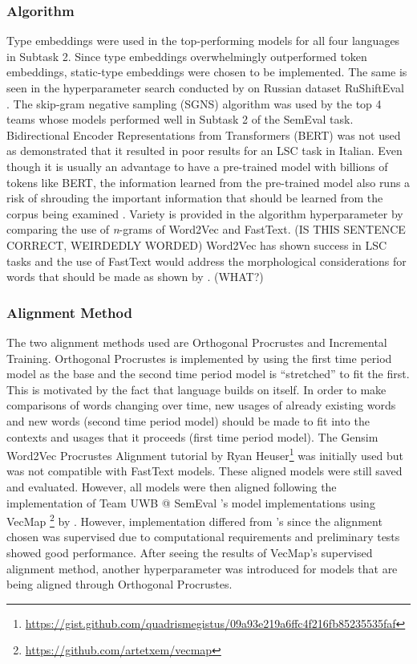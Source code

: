 \subsubsection{Algorithm}

Type embeddings were used in the top-performing models for all four languages in Subtask 2.  Since type embeddings overwhelmingly outperformed token embeddings, static-type embeddings were chosen to be implemented. The same is seen in the hyperparameter search conducted by \citet{hengchen2021SBXrushifteval} on Russian dataset RuShiftEval \citep{rushifteval2021}. The skip-gram negative sampling (SGNS) algorithm was used by the top 4 teams whose models performed well in Subtask 2 of the SemEval task. Bidirectional Encoder Representations from Transformers (BERT) was not used as \citet{laicher-2020} demonstrated that it resulted in poor results for an LSC task in Italian. Even though it is usually an advantage to have a pre-trained model with billions of tokens like BERT, the information learned from the pre-trained model also runs a risk of shrouding the important information that should be learned from the corpus being examined \citep{hengchen2021challenges}. Variety is provided in the algorithm hyperparameter by comparing the use of \emph{n}-grams of Word2Vec and FastText. (IS THIS SENTENCE CORRECT, WEIRDEDLY WORDED) Word2Vec has shown success in LSC tasks and the use of FastText would address the morphological considerations for words that should be made as shown by \citet{bojanowski2017enriching}. (WHAT?)


\subsubsection{Alignment Method}

The two alignment methods used are Orthogonal Procrustes and Incremental Training. Orthogonal Procrustes is implemented by using the first time period model as the base and the second time period model is “stretched” to fit the first. This is motivated by the fact that language builds on itself. In order to make comparisons of words changing over time, new usages of already existing words and new words (second time period model) should be made to fit into the contexts and usages that it proceeds (first time period model). The Gensim Word2Vec Procrustes Alignment tutorial by Ryan Heuser\footnote{\url{https://gist.github.com/quadrismegistus/09a93e219a6ffc4f216fb85235535faf}}  was initially used but was not compatible with FastText models. These aligned models were still saved and evaluated. However, all models were then aligned following the implementation of Team UWB @ SemEval \citet{prazak-etal-2020-uwb}’s model implementations using VecMap \footnote{\url{https://github.com/artetxem/vecmap}} by \citet{artetxe2018generalizing}. However, implementation differed from \citet{prazak-etal-2020-uwb}’s since the alignment chosen was supervised due to computational requirements and preliminary tests showed good performance. After seeing the results of VecMap’s supervised alignment method, another hyperparameter was introduced for models that are being aligned through Orthogonal Procrustes.

